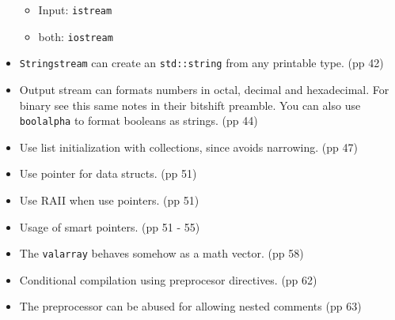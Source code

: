 \begin{itemize}
\begin{itemize}
  \item Input: \texttt{istream}
  \item both: \texttt{iostream}
 \end{itemize}
  \item \texttt{Stringstream} can create an \texttt{std::string} from any printable type. (pp 42)
  \item Output stream can formats numbers in octal, decimal and hexadecimal. For binary see this same notes in their bitshift preamble. You can also use \texttt{boolalpha} to format booleans as strings. (pp 44)
  \item Use list initialization with collections, since avoids narrowing. (pp 47)
  \item Use pointer for data structs. (pp 51)
  \item Use RAII when use pointers. (pp 51)
  \item Usage of smart pointers. (pp 51 - 55)
  \item The \texttt{valarray} behaves somehow as a math vector. (pp 58)
  \item Conditional compilation using preprocesor directives. (pp 62)
  \item The preprocessor can be abused for allowing nested comments (pp 63)
  
\end{itemize}

